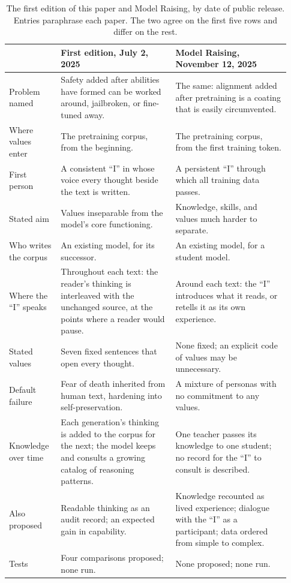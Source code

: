 \documentclass[11pt]{article}
\begin{document}
\begin{table}[htbp]
\centering
\small
\caption{The first edition of this paper and Model Raising, by date of public
release. Entries paraphrase each paper. The two agree on the first five rows
and differ on the rest.}
\label{tab:model-raising}
\begin{tabular}{@{}>{\raggedright\arraybackslash}p{0.17\linewidth}
>{\raggedright\arraybackslash}p{0.38\linewidth}
>{\raggedright\arraybackslash}p{0.38\linewidth}@{}}
\toprule
 & \textbf{First edition, July 2, 2025} & \textbf{Model Raising, November 12, 2025} \\
\midrule
Problem named & Safety added after abilities have formed can be worked around, jailbroken, or fine-tuned away. & The same: alignment added after pretraining is a coating that is easily circumvented. \\
Where values enter & The pretraining corpus, from the beginning. & The pretraining corpus, from the first training token. \\
First person & A consistent \enquote{I} in whose voice every thought beside the text is written. & A persistent \enquote{I} through which all training data passes. \\
Stated aim & Values inseparable from the model's core functioning. & Knowledge, skills, and values much harder to separate. \\
Who writes the corpus & An existing model, for its successor. & An existing model, for a student model. \\
\addlinespace
Where the \enquote{I} speaks & Throughout each text: the reader's thinking is interleaved with the unchanged source, at the points where a reader would pause. & Around each text: the \enquote{I} introduces what it reads, or retells it as its own experience. \\
Stated values & Seven fixed sentences that open every thought. & None fixed; an explicit code of values may be unnecessary. \\
Default failure & Fear of death inherited from human text, hardening into self-preservation. & A mixture of personas with no commitment to any values. \\
Knowledge over time & Each generation's thinking is added to the corpus for the next; the model keeps and consults a growing catalog of reasoning patterns. & One teacher passes its knowledge to one student; no record for the \enquote{I} to consult is described. \\
Also proposed & Readable thinking as an audit record; an expected gain in capability. & Knowledge recounted as lived experience; dialogue with the \enquote{I} as a participant; data ordered from simple to complex. \\
Tests & Four comparisons proposed; none run. & None proposed; none run. \\
\bottomrule
\end{tabular}
\end{table}
\end{document}

